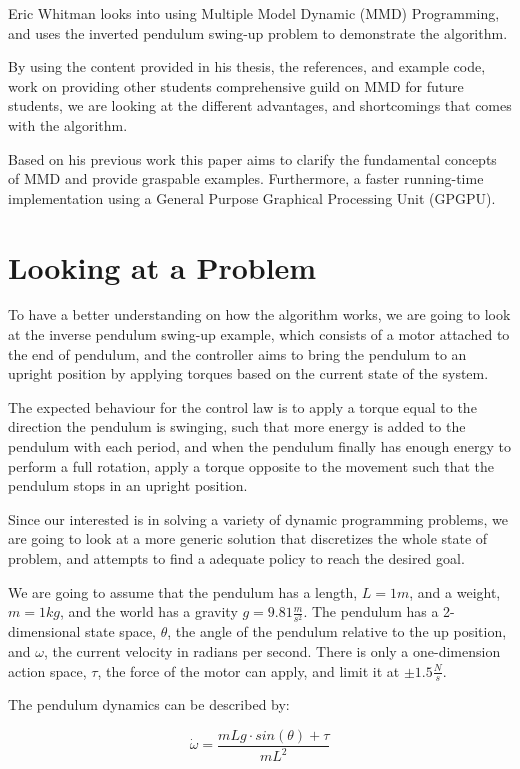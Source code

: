 \documentclass[12pt]{report}
\begin{document}
Eric Whitman looks into using Multiple Model Dynamic (MMD) Programming, and uses the inverted pendulum swing-up problem to demonstrate the algorithm. \cite{eric_thesis}
 
By using the content provided in his thesis, the references, and example code, work on providing other students comprehensive guild on MMD for future students, we are looking at the different advantages, and shortcomings that comes with the algorithm.

Based on his previous work this paper aims to clarify the fundamental concepts of MMD and provide graspable examples. Furthermore, a faster running-time implementation using a General Purpose Graphical Processing Unit (GPGPU).

\section{Looking at a Problem}
To have a better understanding on how the algorithm works, we are going to look at the  inverse pendulum swing-up example, which consists of a motor attached to the end of pendulum, and the controller aims to bring the pendulum to an upright position by applying torques based on the current state of the system. 

The expected behaviour for the control law is to apply a torque equal to the direction the pendulum is swinging, such that more energy is added to the pendulum with each period, and when the pendulum finally has enough energy to perform a full rotation, apply a torque opposite to the movement such that the pendulum stops in an upright position.  

Since our interested is in solving a variety of dynamic programming problems, we are going to look at a more generic solution that discretizes the whole state of problem, and attempts to find a adequate policy to reach the desired goal.

We are going to assume that the pendulum has a length, $L=1m$, and a weight, $m=1kg$, and the world has a gravity $g=9.81\frac{m}{s^2}$. The pendulum has a 2-dimensional state space, $\theta$, the angle of the pendulum relative to the up position, and $\omega$, the current velocity in radians per second. There is only a one-dimension action space, $\tau$, the force of the motor can apply, and limit it at $\pm 1.5 \frac{N}{s}$.

The pendulum dynamics can be described by:

\begin{equation} 
\dot{\omega} = \frac{mLg \cdot sin(\theta) + \tau}{mL^2}
\end{equation}
\end{document}
